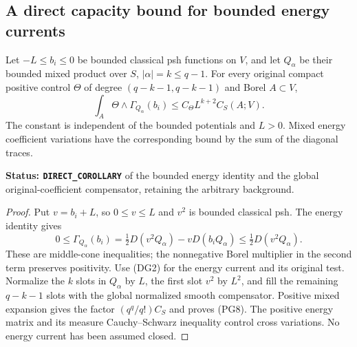 \subsection{A direct capacity bound for bounded energy currents}

\begin{lemma}
\label{lem:r11-bounded-energy-capacity-power}
Let $-L\leq b_i\leq0$ be bounded classical psh functions on $V$,
and let $Q_\alpha$ be their bounded mixed product over $S$,
$|\alpha|=k\leq q-1$. For every original compact positive
control $\Theta$ of degree $(q-k-1,q-k-1)$ and Borel $A\subset V$,
\[
       \int_A\Theta\wedge\Gamma_{Q_\alpha}(b_i)
                 \leq C_\Theta L^{k+2}C_S(A;V).
 \tag{PG8}
\]
The constant is independent of the bounded potentials and $L>0$.
Mixed energy coefficient variations have the corresponding
bound by the sum of the diagonal traces.
\end{lemma}

\noindent\textbf{Status: \texttt{DIRECT\_COROLLARY}} of
the bounded energy identity and the global original-coefficient
compensator, retaining the arbitrary background.

\begin{proof}
Put $v=b_i+L$, so $0\leq v\leq L$ and $v^2$ is bounded
classical psh. The energy identity gives
\[
 0\leq\Gamma_{Q_\alpha}(b_i)
       =\tfrac12D(v^2Q_\alpha)-vD(b_iQ_\alpha)
       \leq\tfrac12D(v^2Q_\alpha).
 \tag{PG9}
\]
These are middle-cone inequalities; the nonnegative Borel
multiplier in the second term preserves positivity.
Use (DG2) for the energy current and its original test.
Normalize the $k$ slots in $Q_\alpha$ by $L$, the first
slot $v^2$ by $L^2$, and fill the remaining $q-k-1$ slots
with the global normalized smooth compensator. Positive
mixed expansion gives the factor $(q^q/q!)C_S$ and proves
(PG8). The positive energy matrix and its measure
Cauchy--Schwarz inequality control cross variations.
No energy current has been assumed closed.
\end{proof}

